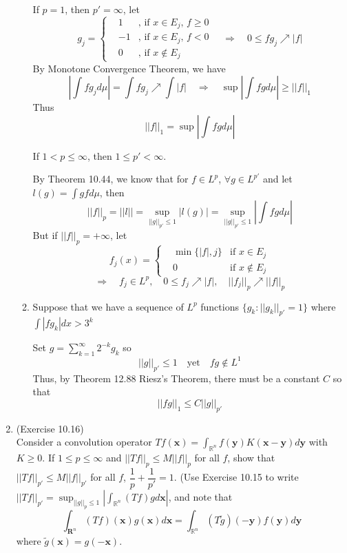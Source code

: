 \documentclass[a4paper,11pt]{article}
\begin{document}
\begin{enumerate}
\begin{enumerate}
			If $p = 1$, then $p' = \infty$, let
				$$g_j = \left\{ \begin{matrix}
				&1 &\text{, if $x \in E_j$, $f \geq 0$}\\
				&-1 &\text{, if $x \in E_j$, $f < 0$}\\
				&0 &\text{, if $x \notin E_j$}
				\end{matrix} \right.
				\quad \Rightarrow \quad
				0 \leq fg_j \nearrow |f|$$
			By Monotone Convergence Theorem, we have
				$$|\int fg_j d\mu| = \int f g_j \nearrow \int |f|
				\quad \Rightarrow \quad
				\sup |\int fg d\mu| \geq ||f||_1$$
			Thus
				$$||f||_1 = \sup |\int fg d\mu|$$

			If $1 < p \leq \infty$, then $1 \leq p' < \infty$.\

			By Theorem 10.44, we know that for $f \in L^p$, $\forall g \in L^{p'}$ and let $l(g) = \int gf d\mu$, then
				$$||f||_p
				= ||l||
				= \underset{||g||_{p'} \leq 1}{\sup} |l(g)|
				= \underset{||g||_{p'} \leq 1}{\sup} |\int fg d\mu|$$
			But if $||f||_p = + \infty$, let
				$$f_j (x) = \left\{
				\begin{matrix}
				&\min \{ |f|, j\} &\text{if $x \in E_j$}\\
				&0 &\text{if $x \notin E_j$}
				\end{matrix}
				\right.$$
			$$\Rightarrow \quad f_j \in L^p, \quad 0 \leq f_j \nearrow |f|, \quad ||f_j||_p \nearrow ||f||_p$$

			\item
				Suppose that we have a sequence of $L^p$ functions $\{g_k : ||g_k||_{p'} = 1 \}$ where $\int |fg_k| dx > 3^k$\

				Set $g = \sum_{k=1}^\infty 2^{-k} g_k$ so
					$$||g||_{p'} \leq 1 \quad \text{yet} \quad fg \notin L^1$$
				Thus, by Theorem 12.88 Riesz's Theorem, there must be a constant $C$ so that
					$$||fg||_1 \leq C ||g||_{p'}$$

				
		\end{enumerate}



	\item (Exercise 10.16)\\
		Consider a convolution operator $Tf(\mathbf{x}) = \int_{\mathbb{R}^n} f(\mathbf{y}) K(\mathbf{x-y}) d\mathbf{y}$ with $K \geq 0$. If $1 \leq p \leq \infty$ and $||Tf||_p \leq M||f||_p$ for all $f$, show that $||Tf||_{p'} \leq M||f||_{p'}$ for all $f$, $\dfrac{1}{p} + \dfrac{1}{p'} = 1$. (Use Exercise 10.15 to write  $||Tf||_{p'} = \sup_{||g||_p \leq 1} |\int_{\mathbb{R}^n} (Tf) g d\mathbf{x}|$, and note that
			$$\int_{\mathbf{R}^n} (Tf) (\mathbf{x})g(\mathbf{x}) d\mathbf{x} = \int_{\mathbb{R}^n} (T \widetilde{g}) (-\mathbf{y}) f(\mathbf{y}) d\mathbf{y}$$
		where $\widetilde{g}(\mathbf{x}) = g(-\mathbf{x}).$\


\end{enumerate}
\end{document}

